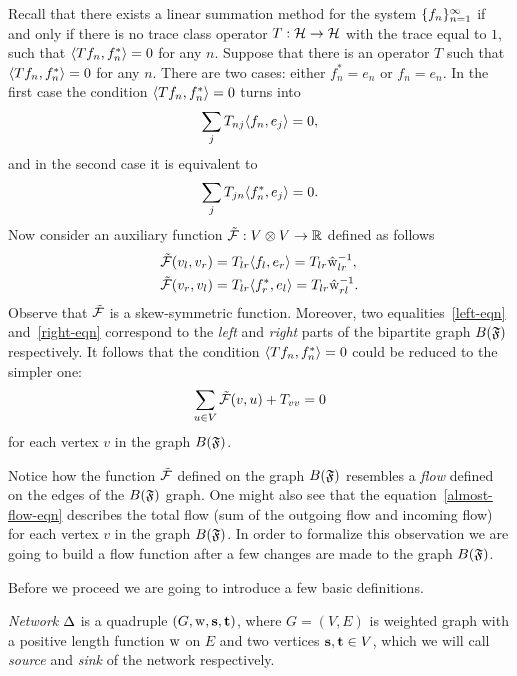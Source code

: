 \documentclass[12pt]{amsart}
\begin{document}
    Recall that there exists a linear summation method for the system $\seq{f}$
      if and only if there is no trace class operator $T: \cal{H} \to \cal{H}$ with the trace equal to $1$,
      such that $\inner{Tf_n}{f_n^*} = 0$ for any $n$.
    Suppose that there is an operator $T$ such that $\inner{Tf_n}{f_n^*} = 0$ for any $n$.
    There are two cases: either $f^*_n = e_n$ or $f_n = e_n$.
    In the first case the condition $\inner{Tf_n}{f_n^*} = 0$ turns into
    \begin{equation}
        \label{left-eqn}
        \sum_j T_{nj} \inner{f_n}{e_j} = 0,
    \end{equation}
    and in the second case it is equivalent to
    \begin{equation}
        \label{right-eqn}
        \sum_j T_{jn} \inner{f^*_n}{e_j} = 0.
    \end{equation}
    Now consider an auxiliary function $\flowsgn: V \otimes V \to \mathbb{R}$ defined as follows
    \begin{align*}
        &\flowsgn(v_l, v_r) = T_{lr} \inner{f_l}{e_r} = T_{lr} \wt_{lr}^{-1},\\
        &\flowsgn(v_r, v_l) = T_{lr} \inner{f^*_r}{e_l} = T_{lr} \wt_{rl}^{-1}.
    \end{align*}
    Observe that $\flowsgn$ is a skew-symmetric function.
    Moreover, two equalities~\eqref{left-eqn} and~\eqref{right-eqn} correspond to the \emph{left} and \emph{right}
      parts of the bipartite graph $B(\fsys)$ respectively.
    It follows that the condition $\inner{Tf_n}{f_n^*} = 0$ could be reduced to the simpler one:
    \begin{equation}
      \label{almost-flow-eqn}
      \sum_{u \in V} \flowsgn(v, u) + T_{vv} = 0
    \end{equation}
      for each vertex $v$ in the graph $B(\fsys)$.
    \begin{remark}
      Notice how the function $\flowsgn$ defined on the graph $B(\fsys)$ resembles
        a \emph{flow} defined on the edges of the $B(\fsys)$ graph.
      One might also see that the equation~\eqref{almost-flow-eqn} describes the total flow (sum of the outgoing flow and incoming flow) 
        for each vertex $v$ in the graph $B(\fsys)$.
      In order to formalize this observation we are going to build a flow function
        after a few changes are made to the graph $B(\fsys)$.
    \end{remark}
    Before we proceed we are going to introduce a few basic definitions.
    \begin{definition}
        \emph{Network} $\net$ is a quadruple $(G, \wtp, \source, \sink)$, where $G = (V, E)$ is weighted graph
        with a positive length function $\wtp$ on $E$ and two vertices $\source, \sink \in V$, which
        we will call \emph{source} and \emph{sink} of the network respectively.
    \end{definition}
\end{document}
